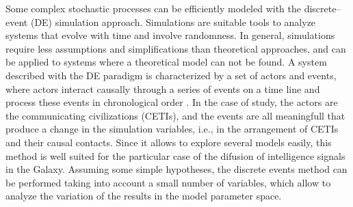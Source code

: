 \documentclass[crop]{CSLB}%
\begin{document}
Some complex stochastic processes can be efficiently modeled with the
discrete--event (DE) simulation approach.
%
Simulations are suitable tools to analyze systems that evolve with
time and involve randomness.
%
In general, simulations require less assumptions and simplifications
than theoretical approaches, and can be applied to systems where a
theoretical model can not be found.
%
A system described with the DE paradigm is characterized by a set of
actors and events, where actors interact causally through a series of
events on a time line and process these events in chronological order
\citep{ptolemaeus_system_2014, chung_simulation_2003,
ross_simulation_2012}.
%
In the case of study, the actors are the communicating civilizations
(CETIs), and the events are all meaningfull that produce a change in
the simulation variables, i.e., in the arrangement of CETIs and their
causal contacts.
%
Since it allows to explore several models easily, 
this method is well suited for the particular case of the difusion of
intelligence signals in the Galaxy.
%
Assuming some simple hypotheses, the discrete events method can be
performed taking into account a small number of variables, which
allow to analyze the variation of the results in the model parameter space.
\end{document}

